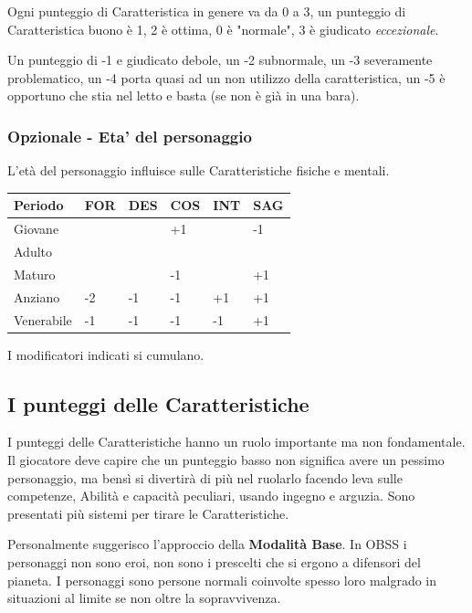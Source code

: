 \begin{multicols}{2}
Ogni punteggio di Caratteristica in genere va da 0 a 3, un punteggio di Caratteristica buono è 1, 2 è ottima, 0 è "normale", 3 è giudicato \emph{eccezionale}.

Un punteggio di -1 e giudicato debole, un -2 subnormale, un -3 severamente problematico, un -4 porta quasi ad un non utilizzo della caratteristica, un -5 è opportuno che stia nel letto e basta (se non è già in una bara).

\subsubsection{Opzionale - Eta' del personaggio}\hypertarget{etadelpersonaggio}{} \label{etadelpersonaggio}

L'età del personaggio influisce sulle Caratteristiche fisiche e mentali.

\medskip

\noindent\begin{tabularx}{\linewidth}{llllll}
	\toprule
\rowcolor{gray!20}\textbf{Periodo} & \textbf{FOR} & \textbf{DES} & \textbf{COS} & \textbf{INT} & \textbf{SAG}\\
\toprule
Giovane& & & +1 & & -1 \\
\rowcolor{gray!20}Adulto& & &  & & \\
Maturo& & & -1 & & +1 \\
\rowcolor{gray!20}Anziano& -2 & -1 & -1 & +1 & +1 \\
Venerabile&-1 & -1 & -1 & -1 & +1 \\
\end{tabularx}

\medskip

I modificatori indicati si cumulano.

\subsection{I punteggi delle Caratteristiche} \hypertarget{assegnazione.punteggi.caratteristica}{}\label{assegnazionepunteggicaratteristica}

I punteggi delle Caratteristiche hanno un ruolo importante ma non fondamentale. Il giocatore deve capire che un punteggio basso non significa avere un pessimo personaggio, ma bensì si divertirà di più nel ruolarlo facendo leva sulle competenze, Abilità e capacità peculiari, usando ingegno e arguzia. Sono presentati più sistemi per tirare le Caratteristiche.

Personalmente suggerisco l'approccio della \textbf{Modalità Base}. In OBSS i personaggi non sono eroi, non sono i prescelti che si ergono a difensori del pianeta. I personaggi sono persone normali coinvolte spesso loro malgrado in situazioni al limite se non oltre la sopravvivenza.


\end{multicols}
